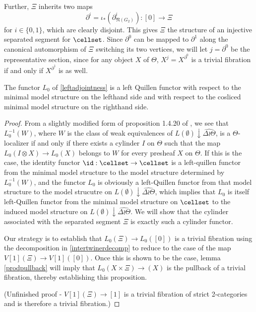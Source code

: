 Further, \(\Xi\) inherits two maps \[\partial^i=\iota_\ast(\partial_{\mathfrak{N}(G_2)}^i):[0]\to \Xi\] for \(i\in \{0,1\}\), which are clearly disjoint.   This gives \(\Xi\) the structure of an injective separated segment for \(\cellset\).  Since \(\partial^0\) can be mapped to \(\partial^1\) along the canonical automorphism of \(\Xi\) switching its two vertices, we will let \(j=\partial^0\) be the representative section, since for any object \(X\) of \(\Theta\), \(X^j=X^{\partial^0}\) is a trivial fibration if and only if \(X^{\partial^1}\) is as well.

\begin{prop}
The functor \(L_0\) of \eqref{leftadjointness} is a left Quillen functor with respect to the minimal model structure on the lefthand side and with respect to the cosliced minimal model structure on the righthand side.
\end{prop}
\begin{proof}
From a slightly modified form of proposition 1.4.20 of \cite{cisinski-book}, we see that \(L_0^{-1}(W)\), where \(W\) is the class of weak equivalences of \(L(\emptyset)\downarrow \widehat{\Delta\wr\Theta}\), is a \(\Theta\)-localizer if and only if there exists a cylinder \(I\) on \(\Theta\) such that the map \(L_0(I\otimes X)\to L_0(X)\) belongs to \(W\) for every presheaf \(X\) on \(\Theta\).  If this is the case, the identity functor \(\id:\cellset\to\cellset\) is a left-quillen functor from the minimal model structure to the model structure determined by \(L_0^{-1}(W)\), and the functor \(L_0\) is obviously a left-Quillen functor from that model structure to the model strucutre on \(L(\emptyset)\downarrow \widehat{\Delta\wr\Theta}\), which implies that \(L_0\) is itself left-Quillen functor from the minimal model structure on \(\cellset\) to the induced model structure on \(L(\emptyset)\downarrow \widehat{\Delta\wr\Theta}\).  We will show that the cylinder associated with the separated segment \(\Xi\) is exactly such a cylinder functor.

Our strategy is to establish that \(L_0(\Xi)\to L_0([0])\) is a trivial fibration using the decomposition in \eqref{intertwinerdecomp} to reduce to the case of the map \(V[1](\Xi)\to V[1]([0])\).  Once this is shown to be the case, lemma \eqref{prodpullback} will imply that \(L_0(X\times \Xi)\to (X)\) is the pullback of a trivial fibration, thereby establishing this proposition.  

(Unfinished proof - \(V[1](\Xi)\to [1]\) is a trivial fibration of strict 2-categories and is therefore a trivial fibration.)
\end{proof} 

